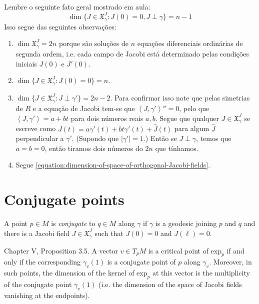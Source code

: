 \begin{remark}
\label{remark-dimension-of-space-of-Jacobi-fields}
Lembre o seguinte fato geral mostrado em aula:
\begin{equation}
\label{equation:dimension-of-space-of-orthogonal-Jacobi-fields}
\dim\{J \in \mathfrak{X}^J_\gamma:J(0)=0, J \perp \gamma\}=n-1
\end{equation}
Isso segue das seguintes observações:
\begin{enumerate}
\item $\dim\mathfrak{X}^J_\gamma=2n$ porque são soluções de $n$ equações
diferenciais ordinárias de segunda ordem, i.e. cada campo de Jacobi está
determinado pelas condições iniciais $J(0)$ e $J'(0)$. 
\item $\dim \{J \in \mathfrak{X}^J_\gamma:J(0)=0\}=n$.
\item $\dim \{J \in \mathfrak{X}^J_\gamma:J\perp \gamma'\}=2n-2$. Para
confirmar isso note que pelas simetrias de $R$ e a equação de Jacobi tem-se
que $\left<J,\gamma'\right>''=0$, pelo que $\left<J,\gamma'\right>=a+bt$
para dois números reais $a,b$. Segue que qualquer $J \in
\mathfrak{X}^J_\gamma$ se escreve como
$J(t)=a\gamma'(t)+bt\gamma'(t)+\hat{J}(t)$ para algum $\hat{J}$
perpendicular a  $\gamma'$. (Supondo que $|\gamma'|=1$.) Então se $J \perp
\gamma$, temos que  $a=b=0$, então tiramos dois números do $2n$ que
tínhamos.
\item Segue \ref{equation:dimension-of-space-of-orthogonal-Jacobi-fields}.
\end{enumerate}

\end{remark}


\section{Conjugate points}
\label{section-conjugate-points}

\begin{definition}
\label{definition-conjugate-points}
A point $p \in M$ is {\it conjugate} to $q \in M$ along $\gamma$ if $\gamma$ is
a geodesic joining $p$ and $q$ and there is a Jacobi field 
$J\in\mathfrak{X}_\gamma^J$ such that $J(0)=0$ and  $J(\ell)=0$.
\end{definition}

\begin{proposition}
\label{proposition-critical-points-exp}
\cite{doc} Chapter V, Proposition 3.5. A vector $v \in T_pM$ is a critical
point of $\text{exp}_p$ if and only if the corresponding 
$\gamma_v(1)$ is a conjugate point of $p$ along $\gamma_v$.
Moreover, in such points, the dimension of the kernel of 
$\text{exp}_p$ at this vector is the multiplicity
of the conjugate point $\gamma_v(1)$ 
(i.e. the dimension of the space of Jacobi fields vanishing 
at the endpoints).
\end{proposition}

